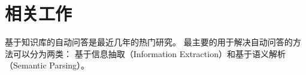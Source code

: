 
\section{相关工作}%
\label{sec:compqa-related}







基于知识库的自动问答是最近几年的热门研究。
最主要的用于解决自动问答的方法可以分为两类：
基于信息抽取（Information Extraction）和基于语义解析（Semantic Parsing）。





